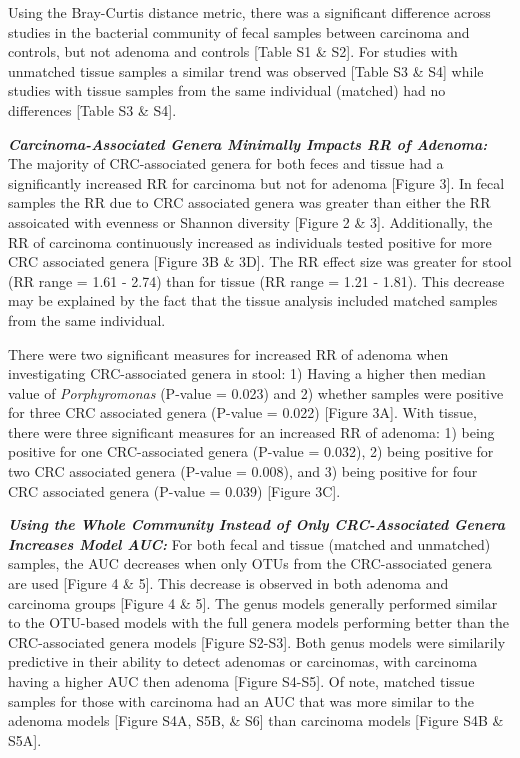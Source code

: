 \documentclass[12pt,]{article}
\begin{document}
Using the Bray-Curtis distance metric, there was a significant
difference across studies in the bacterial community of fecal samples
between carcinoma and controls, but not adenoma and controls {[}Table S1
\& S2{]}. For studies with unmatched tissue samples a similar trend was
observed {[}Table S3 \& S4{]} while studies with tissue samples from the
same individual (matched) had no differences {[}Table S3 \& S4{]}.

\textbf{\emph{Carcinoma-Associated Genera Minimally Impacts RR of
Adenoma:}} The majority of CRC-associated genera for both feces and
tissue had a significantly increased RR for carcinoma but not for
adenoma {[}Figure 3{]}. In fecal samples the RR due to CRC associated
genera was greater than either the RR assoicated with evenness or
Shannon diversity {[}Figure 2 \& 3{]}. Additionally, the RR of carcinoma
continuously increased as individuals tested positive for more CRC
associated genera {[}Figure 3B \& 3D{]}. The RR effect size was greater
for stool (RR range = 1.61 - 2.74) than for tissue (RR range = 1.21 -
1.81). This decrease may be explained by the fact that the tissue
analysis included matched samples from the same individual.

There were two significant measures for increased RR of adenoma when
investigating CRC-associated genera in stool: 1) Having a higher then
median value of \emph{Porphyromonas} (P-value = 0.023) and 2) whether
samples were positive for three CRC associated genera (P-value = 0.022)
{[}Figure 3A{]}. With tissue, there were three significant measures for
an increased RR of adenoma: 1) being positive for one CRC-associated
genera (P-value = 0.032), 2) being positive for two CRC associated
genera (P-value = 0.008), and 3) being positive for four CRC associated
genera (P-value = 0.039) {[}Figure 3C{]}.

\textbf{\emph{Using the Whole Community Instead of Only CRC-Associated
Genera Increases Model AUC:}} For both fecal and tissue (matched and
unmatched) samples, the AUC decreases when only OTUs from the
CRC-associated genera are used {[}Figure 4 \& 5{]}. This decrease is
observed in both adenoma and carcinoma groups {[}Figure 4 \& 5{]}. The
genus models generally performed similar to the OTU-based models with
the full genera models performing better than the CRC-associated genera
models {[}Figure S2-S3{]}. Both genus models were similarily predictive
in their ability to detect adenomas or carcinomas, with carcinoma having
a higher AUC then adenoma {[}Figure S4-S5{]}. Of note, matched tissue
samples for those with carcinoma had an AUC that was more similar to the
adenoma models {[}Figure S4A, S5B, \& S6{]} than carcinoma models
{[}Figure S4B \& S5A{]}.
\end{document}
